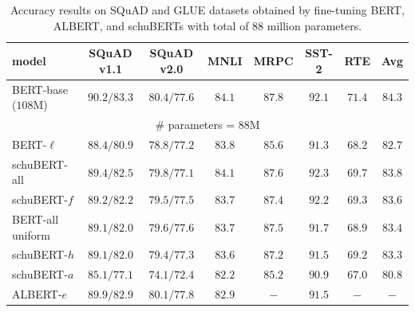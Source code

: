 \documentclass[11pt,a4paper]{article}
\begin{document}
\begin{table}[h]
\centering
\begin{tabular}{lcccccc|c}
model & SQuAD v1.1 & SQuAD v2.0 & MNLI & MRPC & SST-2 & RTE & Avg\\
\hline 
BERT-base ($108$M) & $90.2/83.3$ &$80.4/77.6$& $84.1$ & $87.8$ & $92.1$ & $71.4$ & $84.3$\\
\multicolumn{8}{c}{\# parameters = $88$M}\\
\hline
BERT-$\ell$ & $88.4/80.9$ &$78.8/77.2$& $83.8$ & $85.6$ & $91.3$ & $68.2$ & $82.7$\\
schuBERT-all & $89.4/82.5$ &$79.8/77.1$& $\pmb{84.1}$ & $\pmb{87.6}$ & $\pmb{92.3}$ & $\pmb{69.7}$ & $\pmb{83.8}$\\
schuBERT-$f$ & $89.2/82.2$ &$79.5/77.5$& $83.7$ & $87.4$ & $92.2$ & $69.3$ & $83.6$\\
BERT-all uniform & $89.1/82.0$ &$79.6/77.6$& $83.7$ & $87.5$ & $91.7$ & $68.9$ & $83.4$\\
schuBERT-$h$ & $89.1/82.0$ &$79.4/77.3$& $83.6$ & $87.2$ & $91.5$ & $69.2$ & $83.3$\\
schuBERT-$a$ & $85.1/77.1$ &$74.1/72.4$& $82.2$ & $85.2$ & $90.9$ & $67.0$ & $80.8$\\
ALBERT-$e$ & $\pmb{89.9/82.9}$ &$\pmb{80.1/77.8}$& $82.9$ &$-$& $91.5$ &$-$ & $-$
\end{tabular}
\caption{\label{tab:results_88}Accuracy results on SQuAD and GLUE datasets obtained by fine-tuning BERT, ALBERT, and schuBERTs with total of $88$ million parameters.
}
\end{table}
\end{document}
